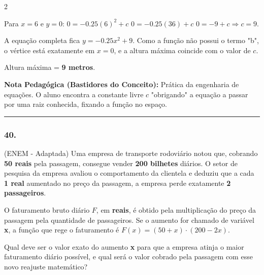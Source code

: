 \begin{multicols*}{2}
\begin{tcolorbox}[colback=CorTitUm!5, colframe=CorTitUm, boxrule=1pt, arc=4pt, left=6pt, right=6pt, top=6pt, bottom=6pt]
    Para $x = 6$ e $y = 0$:
    $0 = -0.25(6)^2 + c$
    $0 = -0.25(36) + c$
    $0 = -9 + c \Rightarrow c = 9$.
    
    A equação completa fica $y = -0.25x^2 + 9$. 
    Como a função não possui o termo "b", o vértice está exatamente em $x=0$, e a altura máxima coincide com o valor de $c$. 
    
    Altura máxima = \textbf{9 metros}.
    \end{tcolorbox}
    \vspace{0.15cm}
    
    \begin{boxexplicacao}
    \textbf{Nota Pedagógica (Bastidores do Conceito):} Prática da engenharia de equações. O aluno encontra a constante livre $c$ "obrigando" a equação a passar por uma raiz conhecida, fixando a função no espaço.
    \end{boxexplicacao}
\fi

\par\vspace{\espacoQuestao}

\noindent\textcolor{CorLinha}{\rule{\linewidth}{0.5pt}} 
\par\vspace{\espacoPreQuestao}
\subsubsection*{40.} 
\begin{enunciadoLiteral}
(ENEM - Adaptada) Uma empresa de transporte rodoviário notou que, cobrando \textbf{50 reais} pela passagem, consegue vender \textbf{200 bilhetes} diários. O setor de pesquisa da empresa avaliou o comportamento da clientela e deduziu que a cada \textbf{1 real} aumentado no preço da passagem, a empresa perde exatamente \textbf{2 passageiros}.

O faturamento bruto diário $F$, em \textbf{reais}, é obtido pela multiplicação do preço da passagem pela quantidade de passageiros. Se o aumento for chamado de variável \textbf{x}, a função que rege o faturamento é $F(x) = (50 + x) \cdot (200 - 2x)$.

Qual deve ser o valor exato do aumento \textbf{x} para que a empresa atinja o maior faturamento diário possível, e qual será o valor cobrado pela passagem com esse novo reajuste matemático?
\end{enunciadoLiteral}


\end{multicols*}
